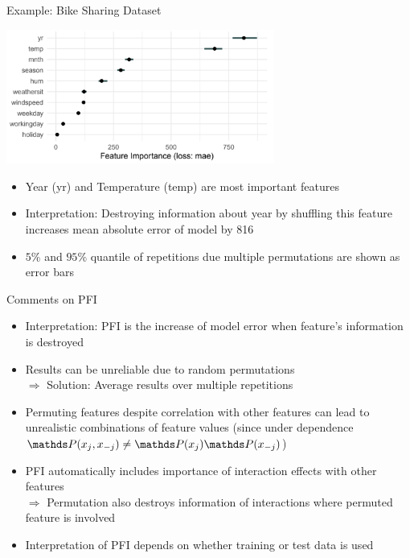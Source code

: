 \documentclass[11pt,compress,t,notes=noshow, aspectratio=169, xcolor=table]{beamer}
\begin{document}
\begin{vbframe}{Example: Bike Sharing Dataset}

\begin{center}
\includegraphics[width=0.66\textwidth]{figure_man/bike-sharing02.png}
\end{center}

\begin{itemize}
 \item Year (yr) and Temperature (temp) are most important features
 \item Interpretation: Destroying information about year by shuffling this feature increases mean absolute error of model by 816
 \item $5 \%$ and $95 \%$ quantile of repetitions due multiple permutations are shown as error bars
\end{itemize}
\end{vbframe}

\begin{vbframe}{Comments on PFI}
 \begin{itemize}
 \itemsep1em
  \item Interpretation: PFI is the increase of model error when feature's information is destroyed
  \item Results can be unreliable due to random permutations \\
  $\Rightarrow$ Solution: Average results over multiple repetitions
  \item Permuting features despite correlation with other features can lead to unrealistic combinations of feature values (since under dependence $\P(x_j,x_{-j}) \neq \P(x_j) \P(x_{-j})$)
  \item PFI automatically includes importance of interaction effects with other features \\
  $\Rightarrow$ Permutation also destroys information of interactions where permuted feature is involved
  \item Interpretation of PFI depends on whether training or test data is used
 \end{itemize}
\end{vbframe}
\end{document}
